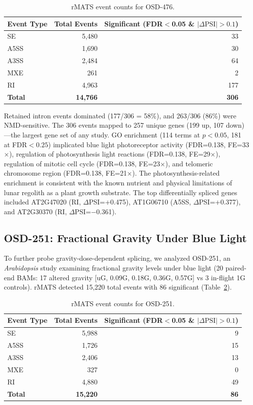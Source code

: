 \documentclass[12pt,a4paper]{article}
\begin{document}
\begin{table}[h]
\centering
\caption{rMATS event counts for OSD-476.}
\label{tab:osd476_events}
\begin{tabular}{lrr}
\toprule
\textbf{Event Type} & \textbf{Total Events} & \textbf{Significant (FDR$<$0.05 \& $|\Delta\text{PSI}|>0.1$)} \\
\midrule
SE & 5,480 & 33 \\
A5SS & 1,690 & 30 \\
A3SS & 2,484 & 64 \\
MXE & 261 & 2 \\
RI & 4,963 & 177 \\
\textbf{Total} & \textbf{14,766} & \textbf{306} \\
\bottomrule
\end{tabular}
\end{table}

Retained intron events dominated (177/306 = 58\%), and 263/306 (86\%) were NMD-sensitive. The 306 events mapped to 257 unique genes (199 up, 107 down)---the largest gene set of any study. GO enrichment (114 terms at $p<0.05$, 181 at FDR$<0.25$) implicated blue light photoreceptor activity (FDR=0.138, FE=33$\times$), regulation of photosynthesis light reactions (FDR=0.138, FE=29$\times$), regulation of mitotic cell cycle (FDR=0.138, FE=23$\times$), and telomeric chromosome region (FDR=0.138, FE=21$\times$). The photosynthesis-related enrichment is consistent with the known nutrient and physical limitations of lunar regolith as a plant growth substrate. The top differentially spliced genes included AT2G47020 (RI, $\Delta$PSI=+0.475), AT1G06710 (A5SS, $\Delta$PSI=+0.377), and AT2G30370 (RI, $\Delta$PSI=$-$0.361).

\subsection{OSD-251: Fractional Gravity Under Blue Light}

To further probe gravity-dose-dependent splicing, we analyzed OSD-251, an \textit{Arabidopsis} study examining fractional gravity levels under blue light (20 paired-end BAMs: 17 altered gravity [uG, 0.09G, 0.18G, 0.36G, 0.57G] vs 3 in-flight 1G controls). rMATS detected 15,220 total events with 86 significant (Table~\ref{tab:osd251_events}).

\begin{table}[h]
\centering
\caption{rMATS event counts for OSD-251.}
\label{tab:osd251_events}
\begin{tabular}{lrr}
\toprule
\textbf{Event Type} & \textbf{Total Events} & \textbf{Significant (FDR$<$0.05 \& $|\Delta\text{PSI}|>0.1$)} \\
\midrule
SE & 5,988 & 9 \\
A5SS & 1,726 & 15 \\
A3SS & 2,406 & 13 \\
MXE & 327 & 0 \\
RI & 4,880 & 49 \\
\textbf{Total} & \textbf{15,220} & \textbf{86} \\
\bottomrule
\end{tabular}
\end{table}
\end{document}
